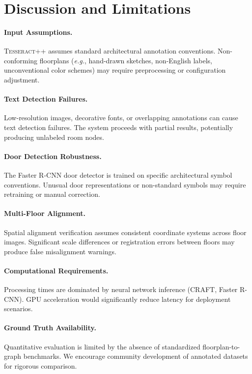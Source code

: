 \documentclass[manuscript,screen,review]{acmart}
\newcommand{\tesseract}{\textsc{Tesseract++}}
\newcommand{\eg}{\textit{e.g.}}
\begin{document}
\section{Discussion and Limitations}
\label{sec:discussion}

\paragraph{Input Assumptions.}
\tesseract{} assumes standard architectural annotation conventions. Non-conforming floorplans (\eg, hand-drawn sketches, non-English labels, unconventional color schemes) may require preprocessing or configuration adjustment.

\paragraph{Text Detection Failures.}
Low-resolution images, decorative fonts, or overlapping annotations can cause text detection failures. The system proceeds with partial results, potentially producing unlabeled room nodes.

\paragraph{Door Detection Robustness.}
The Faster R-CNN door detector is trained on specific architectural symbol conventions. Unusual door representations or non-standard symbols may require retraining or manual correction.

\paragraph{Multi-Floor Alignment.}
Spatial alignment verification assumes consistent coordinate systems across floor images. Significant scale differences or registration errors between floors may produce false misalignment warnings.

\paragraph{Computational Requirements.}
Processing times are dominated by neural network inference (CRAFT, Faster R-CNN). GPU acceleration would significantly reduce latency for deployment scenarios.

\paragraph{Ground Truth Availability.}
Quantitative evaluation is limited by the absence of standardized floorplan-to-graph benchmarks. We encourage community development of annotated datasets for rigorous comparison.
\end{document}
